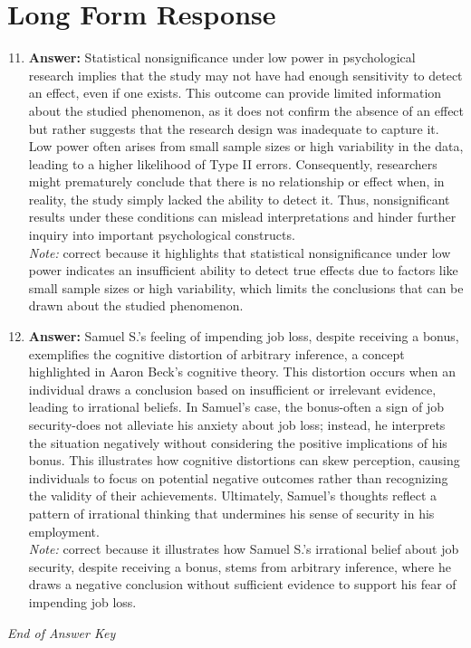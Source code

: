 \documentclass[12pt]{article}
\begin{document}
\section*{Long Form Response}
\begin{enumerate}[label=\arabic*.]
\setcounter{enumi}{10}
\item \textbf{Answer:} Statistical nonsignificance under low power in psychological research implies that the study may not have had enough sensitivity to detect an effect, even if one exists. This outcome can provide limited information about the studied phenomenon, as it does not confirm the absence of an effect but rather suggests that the research design was inadequate to capture it. Low power often arises from small sample sizes or high variability in the data, leading to a higher likelihood of Type II errors. Consequently, researchers might prematurely conclude that there is no relationship or effect when, in reality, the study simply lacked the ability to detect it. Thus, nonsignificant results under these conditions can mislead interpretations and hinder further inquiry into important psychological constructs.
\\ \textit{Note:} correct because it highlights that statistical nonsignificance under low power indicates an insufficient ability to detect true effects due to factors like small sample sizes or high variability, which limits the conclusions that can be drawn about the studied phenomenon.
\item \textbf{Answer:} Samuel S.'s feeling of impending job loss, despite receiving a bonus, exemplifies the cognitive distortion of arbitrary inference, a concept highlighted in Aaron Beck's cognitive theory. This distortion occurs when an individual draws a conclusion based on insufficient or irrelevant evidence, leading to irrational beliefs. In Samuel's case, the bonus-often a sign of job security-does not alleviate his anxiety about job loss; instead, he interprets the situation negatively without considering the positive implications of his bonus. This illustrates how cognitive distortions can skew perception, causing individuals to focus on potential negative outcomes rather than recognizing the validity of their achievements. Ultimately, Samuel's thoughts reflect a pattern of irrational thinking that undermines his sense of security in his employment.
\\ \textit{Note:} correct because it illustrates how Samuel S.'s irrational belief about job security, despite receiving a bonus, stems from arbitrary inference, where he draws a negative conclusion without sufficient evidence to support his fear of impending job loss.
\end{enumerate}

\vfill
\noindent\textit{End of Answer Key}
\end{document}
